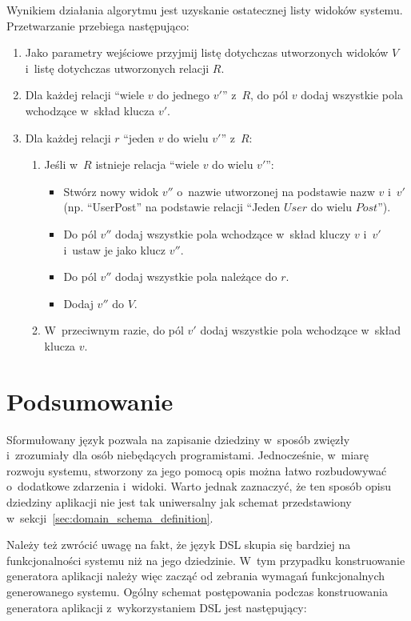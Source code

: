 Wynikiem działania algorytmu jest uzyskanie ostatecznej listy widoków systemu.
Przetwarzanie przebiega następująco:

\begin{enumerate}
 \item Jako parametry wejściowe przyjmij listę dotychczas utworzonych widoków $V$ i~listę dotychczas utworzonych relacji $R$.
 
 \item Dla każdej relacji ``wiele $v$ do jednego $v'$'' z~$R$, do pól $v$ dodaj wszystkie pola wchodzące w~skład klucza $v'$.
 
 \item Dla każdej relacji $r$ ``jeden $v$ do wielu $v'$'' z~$R$:
  \begin{enumerate}
   \item Jeśli w~$R$ istnieje relacja ``wiele $v$ do wielu $v'$'':
    \begin{itemize}
     \item Stwórz nowy widok $v''$ o~nazwie utworzonej na podstawie nazw $v$ i~$v'$ (np. ``UserPost'' na podstawie relacji ``Jeden $User$ do wielu $Post$'').
     \item Do pól $v''$ dodaj wszystkie pola wchodzące w~skład kluczy $v$ i~$v'$ i~ustaw je jako klucz $v''$.
     \item Do pól $v''$ dodaj wszystkie pola należące do $r$.
     \item Dodaj $v''$ do $V$.
    \end{itemize}
   \item W~przeciwnym razie, do pól $v'$ dodaj wszystkie pola wchodzące w~skład klucza $v$.
  \end{enumerate}
\end{enumerate}



\section{Podsumowanie}

Sformułowany język pozwala na zapisanie dziedziny w~sposób zwięzły i~zrozumiały dla osób niebędących programistami.
Jednocześnie, w~miarę rozwoju systemu, stworzony za jego pomocą opis można łatwo rozbudowywać o~dodatkowe zdarzenia i~widoki.
Warto jednak zaznaczyć, że ten sposób opisu dziedziny aplikacji nie jest tak uniwersalny jak schemat przedstawiony w~sekcji~\ref{sec:domain_schema_definition}.

Należy też zwrócić uwagę na fakt, że język DSL skupia się bardziej na funkcjonalności systemu niż na jego dziedzinie.
W~tym przypadku konstruowanie generatora aplikacji należy więc zacząć od zebrania wymagań funkcjonalnych generowanego systemu.
Ogólny schemat postępowania podczas konstruowania generatora aplikacji z~wykorzystaniem DSL jest następujący:

